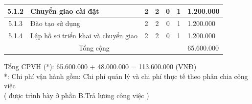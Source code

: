 \begin{longtable}{|c|p{3cm}|c|c|c|c|p{3cm}|}
    5.1.2                           & Chuyển giao cài đặt                                           & 2                                              & 2                                               & 0                                                               & 1                  & 1.200.000  \\ \hline
    5.1.3                           & Đào tạo sử dụng                                               & 2                                              & 2                                               & 0                                                               & 1                  & 1.200.000  \\ \hline
    5.1.4                           & Lập hồ sơ triển khai và chuyển giao                           & 2                                              & 2                                               & 0                                                               & 1                  & 1.200.000  \\ \hline
    \multicolumn{6}{|c|}{Tổng cộng} & 65.600.000                                                                                                                                                                                                                                                           \\ \hline
\end{longtable}

\begin{tabbing}
    Tổng CPVH (*): 65.600.000 + 48.000.000 = \= 113.600.000 (VNĐ) \\
    *: Chi phí vận hành gồm: Chi phí quản lý và chi phí thực tế theo phân chia công việc \\
    ( được trình bày ở phần B.Trả lương công việc ) %
\end{tabbing}

